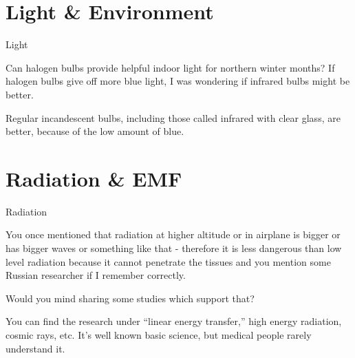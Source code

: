 \documentclass[11pt,oneside,openany,extrafontsizes]{memoir}
\begin{document}
\section{Light \& Environment}

\begin{qaexchange}{Light}

    \begin{question}
        Can halogen bulbs provide helpful indoor light for northern winter months? If halogen bulbs give off more blue light, I was wondering if infrared bulbs might be better.
    \end{question}

    \begin{answer}
      Regular incandescent bulbs, including those called infrared with clear glass, are better, because of the low amount of blue.
    \end{answer}
\end{qaexchange}

\section{Radiation \& EMF}

\begin{qaexchange}{Radiation}

    \begin{question}
        You once mentioned that radiation at higher altitude or in airplane is bigger or has bigger waves or something like that - therefore it is less dangerous than low level radiation because it cannot penetrate the tissues and you mention some Russian researcher if I remember correctly.

		Would you mind sharing some studies which support that?
    \end{question}

    \begin{answer}
      You can find the research under \enquote{linear energy transfer,} high energy radiation, cosmic rays, etc. It's well known basic science, but medical people rarely understand it.
    \end{answer}
\end{qaexchange}
\end{document}
